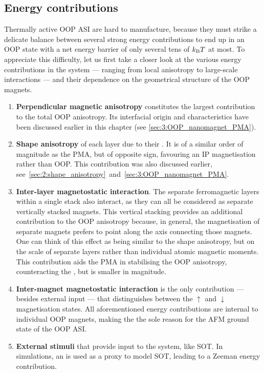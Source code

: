 \subsection{Energy contributions} \label{sec:3:E_contributions}
Thermally active OOP ASI are hard to manufacture, because they must strike a delicate balance between several strong energy contributions to end up in an OOP state with a net energy barrier of only several tens of $\kBT$ at most.
To appreciate this difficulty, let us first take a closer look at the various energy contributions in the system --- ranging from local anisotropy to large-scale interactions --- and their dependence on the geometrical structure of the OOP magnets.
\begin{enumerate}
	\item \textbf{Perpendicular magnetic anisotropy} constitutes the largest contribution to the total OOP anisotropy.
	Its interfacial origin and characteristics have been discussed earlier in this chapter (see \cref{sec:3:OOP_nanomagnet_PMA}). %
	\item \textbf{Shape anisotropy} of each layer due to their .
	It is of a similar order of magnitude as the PMA, but of opposite sign, favouring an IP magnetisation rather than OOP.
	This contribution was also discussed earlier, see~\cref{sec:2:shape_anisotropy}~and~\ref{sec:3:OOP_nanomagnet_PMA}. %
	\item \textbf{Inter-layer magnetostatic interaction}.
	The separate ferromagnetic layers within a single stack also interact, as they can all be considered as separate vertically stacked magnets.
	This vertical stacking provides an additional contribution to the OOP anisotropy because, in general, the magnetisation of separate magnets prefers to point along the axis connecting those magnets.
	One can think of this effect as being similar to the shape anisotropy, but on the scale of separate layers rather than individual atomic magnetic moments.
	This contribution aids the PMA in stabilising the OOP anisotropy, counteracting the , but is smaller in magnitude. %
	\item \textbf{Inter-magnet magnetostatic interaction} is the only contribution --- besides external input --- that distinguishes between the $\uparrow$ and $\downarrow$ magnetisation states.
	All aforementioned energy contributions are internal to individual OOP magnets, making the  the sole reason for the AFM ground state of the OOP ASI. %
	\item \textbf{External stimuli} that provide input to the system, like SOT.
	In simulations, an  is used as a proxy to model SOT, leading to a Zeeman energy contribution.
\end{enumerate}
